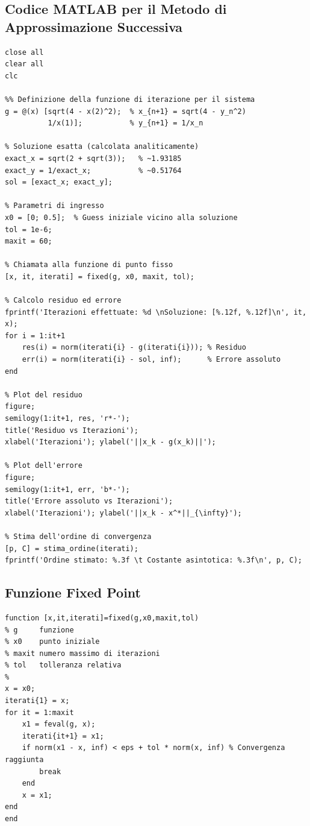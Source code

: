 \documentclass[11pt]{article}
\begin{document}
\subsection*{Codice MATLAB per il Metodo di Approssimazione Successiva}

\begin{lstlisting}
close all
clear all
clc

%% Definizione della funzione di iterazione per il sistema
g = @(x) [sqrt(4 - x(2)^2);  % x_{n+1} = sqrt(4 - y_n^2)
          1/x(1)];           % y_{n+1} = 1/x_n

% Soluzione esatta (calcolata analiticamente)
exact_x = sqrt(2 + sqrt(3));   % ~1.93185
exact_y = 1/exact_x;           % ~0.51764
sol = [exact_x; exact_y];

% Parametri di ingresso
x0 = [0; 0.5];  % Guess iniziale vicino alla soluzione
tol = 1e-6;
maxit = 60;

% Chiamata alla funzione di punto fisso
[x, it, iterati] = fixed(g, x0, maxit, tol);

% Calcolo residuo ed errore
fprintf('Iterazioni effettuate: %d \nSoluzione: [%.12f, %.12f]\n', it, x);
for i = 1:it+1
    res(i) = norm(iterati{i} - g(iterati{i})); % Residuo
    err(i) = norm(iterati{i} - sol, inf);      % Errore assoluto
end

% Plot del residuo
figure;
semilogy(1:it+1, res, 'r*-');
title('Residuo vs Iterazioni');
xlabel('Iterazioni'); ylabel('||x_k - g(x_k)||');

% Plot dell'errore
figure;
semilogy(1:it+1, err, 'b*-');
title('Errore assoluto vs Iterazioni');
xlabel('Iterazioni'); ylabel('||x_k - x^*||_{\infty}');

% Stima dell'ordine di convergenza
[p, C] = stima_ordine(iterati); 
fprintf('Ordine stimato: %.3f \t Costante asintotica: %.3f\n', p, C);
\end{lstlisting}

\subsection*{Funzione Fixed Point}

\begin{lstlisting}
function [x,it,iterati]=fixed(g,x0,maxit,tol)
% g     funzione
% x0    punto iniziale
% maxit numero massimo di iterazioni
% tol   tolleranza relativa
%
x = x0;
iterati{1} = x;
for it = 1:maxit
    x1 = feval(g, x);
    iterati{it+1} = x1;
    if norm(x1 - x, inf) < eps + tol * norm(x, inf) % Convergenza raggiunta
        break
    end
    x = x1;  
end
end
\end{lstlisting}
\end{document}
